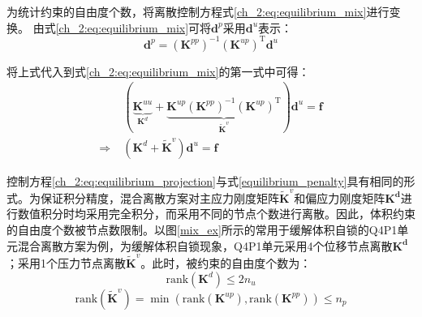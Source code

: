 为统计约束的自由度个数，将离散控制方程式\eqref{ch_2:eq:equilibrium_mix}进行变换。
由式\eqref{ch_2:eq:equilibrium_mix}可将$\boldsymbol d^p$采用$\boldsymbol d^u$表示：
\begin{equation}
    \boldsymbol d^p = (\boldsymbol K^{pp})^{-1} (\boldsymbol K^{up})^{\mathrm T} \boldsymbol d^u
\end{equation}

将上式代入到式\eqref{ch_2:eq:equilibrium_mix}的第一式中可得：
\begin{equation}\label{ch_2:eq:equilibrium_projection}
    \begin{split}
        &(\underbrace{\boldsymbol K^{uu}}_{\boldsymbol K^d} +  \underbrace{\boldsymbol K^{up}(\boldsymbol K^{pp})^{-1}(\boldsymbol K^{up})^{\mathrm T}}_{\tilde{\boldsymbol K}^v}) \boldsymbol d^u = \boldsymbol f \\
        \Rightarrow\;& (\boldsymbol K^d + \tilde{\boldsymbol K}^v) \boldsymbol d^u= \boldsymbol f
    \end{split}
\end{equation}

控制方程\eqref{ch_2:eq:equilibrium_projection}与式\eqref{equilibrium_penalty}具有相同的形式。为保证积分精度，混合离散方案对主应力刚度矩阵$\tilde{\boldsymbol K}^v$和偏应力刚度矩阵$\boldsymbol{K^d}$进行数值积分时均采用完全积分，而采用不同的节点个数进行离散。因此，体积约束的自由度个数被节点数限制。以图\ref{mix_ex}所示的常用于缓解体积自锁的Q4P1单元混合离散方案为例，为缓解体积自锁现象，Q4P1单元采用4个位移节点离散$\boldsymbol{K^d}$；采用1个压力节点离散$\tilde{\boldsymbol K}^v$。此时，被约束的自由度个数为：
\begin{equation}
    \mathrm{rank}(\boldsymbol K^d)\le 2n_u
\end{equation}
\begin{equation}
    \mathrm{rank}(\tilde{\boldsymbol K}^v)=\min(\mathrm{rank}({\boldsymbol K}^{up}),\mathrm{rank}({\boldsymbol K}^{pp}))\le n_p
\end{equation}

